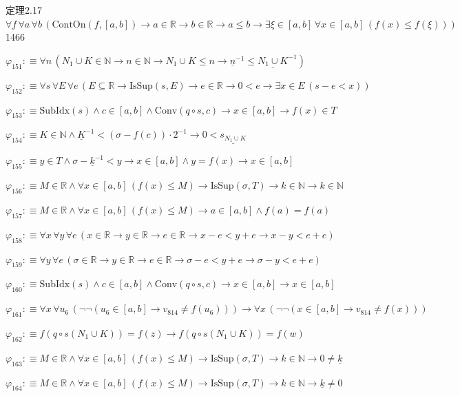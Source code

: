 \begin{fullproof}{定理2.17}{$\forall f\,\forall a\,\forall b\,(\mathrm{ContOn}(f,[a,b]) \to a \in \mathbb{R} \to b \in \mathbb{R} \to a \leq b \to \exists \xi \in [a,b]\,\forall x \in [a,b]\,(f(x) \leq f(\xi)))$}{1466}
\begin{abbrevlist}
\item $\varphi_{151} :\equiv \forall n\,(N_{1} \cup K \in \mathbb{N} \to n \in \mathbb{N} \to N_{1} \cup K \leq n \to \underline{n}^{-1} \leq \underline{N_{1} \cup K}^{-1})$
\item $\varphi_{152} :\equiv \forall s\,\forall E\,\forall e\,(E \subseteq \mathbb{R} \to \mathrm{IsSup}(s,E) \to e \in \mathbb{R} \to 0 < e \to \exists x \in E\,(s - e < x))$
\item $\varphi_{153} :\equiv \mathrm{SubIdx}(s) \land c \in [a,b] \land \mathrm{Conv}(q \circ s,c) \to x \in [a,b] \to f(x) \in T$
\item $\varphi_{154} :\equiv K \in \mathbb{N} \land \underline{K}^{-1} < (\sigma - f(c)) \cdot 2^{-1} \to 0 < \underline{s_{N_{1} \cup K}}$
\item $\varphi_{155} :\equiv y \in T \land \sigma - \underline{k}^{-1} < y \to x \in [a,b] \land y = f(x) \to x \in [a,b]$
\item $\varphi_{156} :\equiv M \in \mathbb{R} \land \forall x \in [a,b]\,(f(x) \leq M) \to \mathrm{IsSup}(\sigma,T) \to k \in \mathbb{N} \to k \in \mathbb{N}$
\item $\varphi_{157} :\equiv M \in \mathbb{R} \land \forall x \in [a,b]\,(f(x) \leq M) \to a \in [a,b] \land f(a) = f(a)$
\item $\varphi_{158} :\equiv \forall x\,\forall y\,\forall e\,(x \in \mathbb{R} \to y \in \mathbb{R} \to e \in \mathbb{R} \to x - e < y + e \to x - y < e + e)$
\item $\varphi_{159} :\equiv \forall y\,\forall e\,(\sigma \in \mathbb{R} \to y \in \mathbb{R} \to e \in \mathbb{R} \to \sigma - e < y + e \to \sigma - y < e + e)$
\item $\varphi_{160} :\equiv \mathrm{SubIdx}(s) \land c \in [a,b] \land \mathrm{Conv}(q \circ s,c) \to x \in [a,b] \to x \in [a,b]$
\item $\varphi_{161} :\equiv \forall x\,\forall u_{6}\,(\neg \neg (u_{6} \in [a,b] \to v_{814} \neq f(u_{6}))) \to \forall x\,(\neg \neg (x \in [a,b] \to v_{814} \neq f(x)))$
\item $\varphi_{162} :\equiv f(q \circ s(N_{1} \cup K)) = f(z) \to f(q \circ s(N_{1} \cup K)) = f(w)$
\item $\varphi_{163} :\equiv M \in \mathbb{R} \land \forall x \in [a,b]\,(f(x) \leq M) \to \mathrm{IsSup}(\sigma,T) \to k \in \mathbb{N} \to 0 \neq \underline{k}$
\item $\varphi_{164} :\equiv M \in \mathbb{R} \land \forall x \in [a,b]\,(f(x) \leq M) \to \mathrm{IsSup}(\sigma,T) \to k \in \mathbb{N} \to \underline{k} \neq 0$

\end{abbrevlist}
\end{fullproof}
